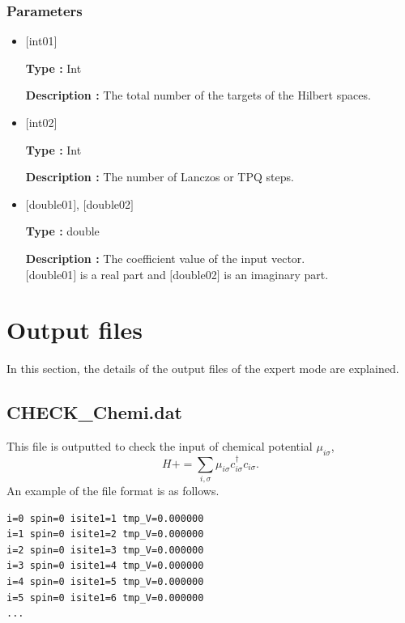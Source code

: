 \subsubsection{Parameters}
 \begin{itemize}

  \item  $[$int01$]$

 {\bf Type :} Int

{\bf Description :}  The total number of the targets of the Hilbert spaces.

  \item  $[$int02$]$

 {\bf Type :} Int

{\bf Description :}  { The number of Lanczos or TPQ steps.}

 \item  $[$double01$]$, $[$double02$]$

 {\bf Type :} double 

{\bf Description :} The coefficient value of the input vector.\\
$[$double01$]$ is a real part and $[$double02$]$ is an imaginary part.\\

\end{itemize}

\newpage
\section{Output files}
\label{Sec:outputfile}
In this section, the details of the output files of the expert mode are explained.
\subsection{CHECK\_Chemi.dat}
\label{Subsec:checkchemi}
This file is outputted to check the input of chemical potential $\mu_{i\sigma}$,
\begin{equation}
H+=\sum_{i,\sigma} \mu_{i\sigma} c_{i\sigma}^{\dagger}c_{i\sigma}.
\end{equation}
An example of the file format is as follows.

\begin{minipage}{12.5cm}
\begin{screen}
\begin{verbatim}
i=0 spin=0 isite1=1 tmp_V=0.000000 
i=1 spin=0 isite1=2 tmp_V=0.000000 
i=2 spin=0 isite1=3 tmp_V=0.000000 
i=3 spin=0 isite1=4 tmp_V=0.000000 
i=4 spin=0 isite1=5 tmp_V=0.000000 
i=5 spin=0 isite1=6 tmp_V=0.000000 
...
\end{verbatim}
\end{screen}
\end{minipage}

